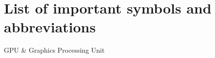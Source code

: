 \chapter*{List of important symbols and abbreviations}

\begin{symbols}
    GPU    & Graphics Processing Unit \\
\end{symbols}
